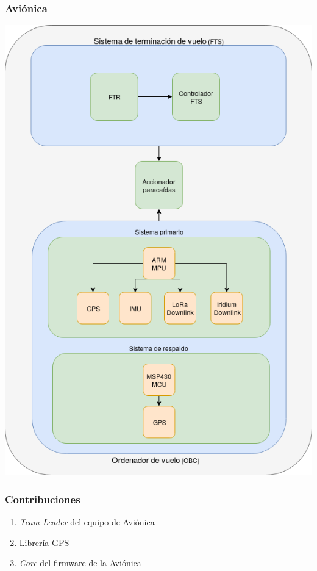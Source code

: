 \documentclass[numfooter]{beamer}
\begin{document}
    \begin{frame}
        \frametitle{Aviónica}
        \includegraphics[height=0.8\textheight]{images/avionics.png}
    \end{frame}

    \begin{frame}
        \frametitle{Contribuciones}
        \begin{enumerate}
            \item \textit{Team Leader} del equipo de Aviónica
            \item Librería GPS
            \item \textit{Core} del firmware de la Aviónica
        \end{enumerate}
    \end{frame}
  
\end{document}
